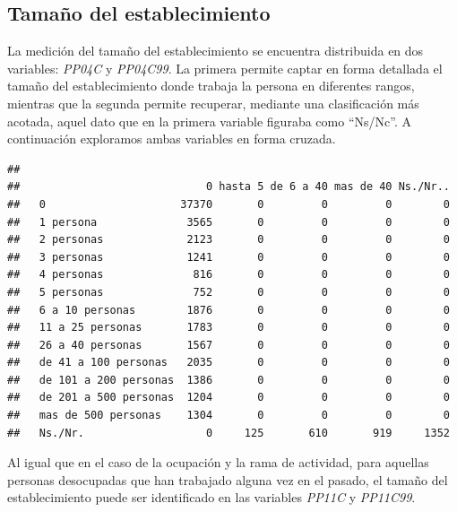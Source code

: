 \documentclass[
]{book}
\newenvironment{Shaded}{\begin{snugshade}}{\end{snugshade}}
\newcommand{\FunctionTok}[1]{\textcolor[rgb]{0.00,0.00,0.00}{#1}}
\newcommand{\NormalTok}[1]{#1}
\newcommand{\SpecialCharTok}[1]{\textcolor[rgb]{0.00,0.00,0.00}{#1}}
\begin{document}
\hypertarget{tamauxf1o-del-establecimiento-1}{%
\subsection{Tamaño del establecimiento}\label{tamauxf1o-del-establecimiento-1}}

La medición del tamaño del establecimiento se encuentra distribuida en dos variables: \emph{PP04C} y \emph{PP04C99}. La primera permite captar en forma detallada el tamaño del establecimiento donde trabaja la persona en diferentes rangos, mientras que la segunda permite recuperar, mediante una clasificación más acotada, aquel dato que en la primera variable figuraba como ``Ns/Nc''. A continuación exploramos ambas variables en forma cruzada.

\begin{Shaded}
\end{Shaded}

\begin{verbatim}
##                        
##                             0 hasta 5 de 6 a 40 mas de 40 Ns./Nr..
##   0                     37370       0         0         0        0
##   1 persona              3565       0         0         0        0
##   2 personas             2123       0         0         0        0
##   3 personas             1241       0         0         0        0
##   4 personas              816       0         0         0        0
##   5 personas              752       0         0         0        0
##   6 a 10 personas        1876       0         0         0        0
##   11 a 25 personas       1783       0         0         0        0
##   26 a 40 personas       1567       0         0         0        0
##   de 41 a 100 personas   2035       0         0         0        0
##   de 101 a 200 personas  1386       0         0         0        0
##   de 201 a 500 personas  1204       0         0         0        0
##   mas de 500 personas    1304       0         0         0        0
##   Ns./Nr.                   0     125       610       919     1352
\end{verbatim}

Al igual que en el caso de la ocupación y la rama de actividad, para aquellas personas desocupadas que han trabajado alguna vez en el pasado, el tamaño del establecimiento puede ser identificado en las variables \emph{PP11C} y \emph{PP11C99}.
\end{document}
